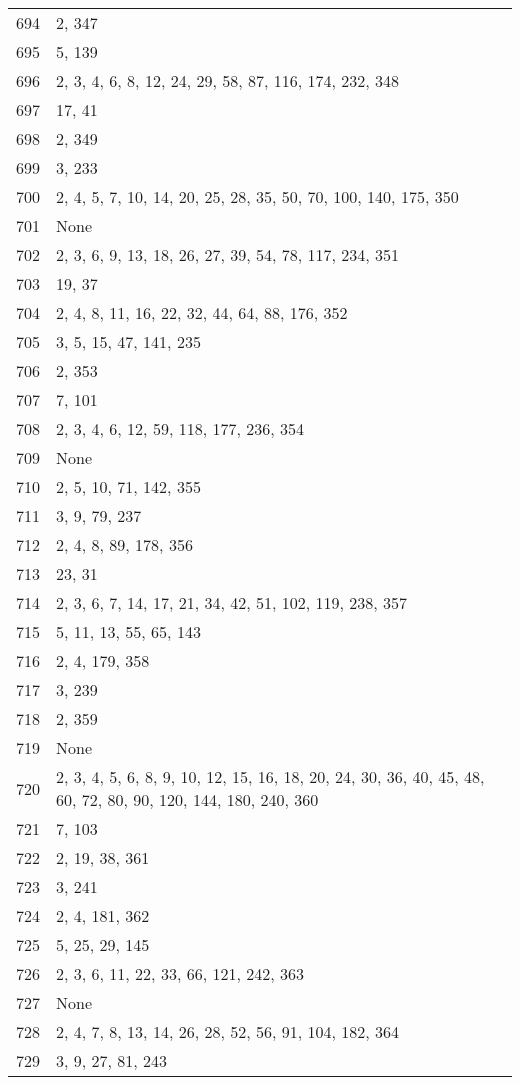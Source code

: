 \documentclass[12pt]{article}
\begin{document}
\begin{tabular}{|r|l|}
694 & 2, 347 \\ 
695 & 5, 139 \\ 
696 & 2, 3, 4, 6, 8, 12, 24, 29, 58, 87, 116, 174, 232, 348 \\ 
697 & 17, 41 \\ 
698 & 2, 349 \\ 
699 & 3, 233 \\ 
700 & 2, 4, 5, 7, 10, 14, 20, 25, 28, 35, 50, 70, 100, 140, 175,  350 \\ 
701 & None \\ 
702 & 2, 3, 6, 9, 13, 18, 26, 27, 39, 54, 78, 117, 234, 351 \\ 
703 & 19, 37 \\ 
704 & 2, 4, 8, 11, 16, 22, 32, 44, 64, 88, 176, 352 \\ 
705 & 3, 5, 15, 47, 141, 235 \\ 
706 & 2, 353 \\ 
707 & 7, 101 \\ 
708 & 2, 3, 4, 6, 12, 59, 118, 177, 236, 354 \\ 
709 & None \\ 
710 & 2, 5, 10, 71, 142, 355 \\ 
711 & 3, 9, 79, 237 \\ 
712 & 2, 4, 8, 89, 178, 356 \\ 
713 & 23, 31 \\ 
714 & 2, 3, 6, 7, 14, 17, 21, 34, 42,  51, 102, 119, 238, 357 \\ 
715 & 5, 11, 13, 55, 65, 143 \\ 
716 & 2,  4, 179, 358 \\ 
717 & 3, 239 \\ 
718 & 2, 359 \\ 
719 & None \\ 
720 & 2, 3, 4, 5, 6, 8, 9, 10, 12, 15, 16, 18,  20, 24, 30, 36, 40, 45, 48, 60, 72, 80, 90, 120, 144, 180, 240,  360 \\ 
721 & 7, 103 \\ 
722 & 2, 19, 38, 361 \\ 
723 & 3, 241 \\ 
724 & 2, 4, 181, 362 \\ 
725 & 5, 25, 29, 145 \\ 
726 & 2, 3, 6, 11, 22, 33,  66, 121, 242, 363 \\ 
727 & None \\ 
728 & 2, 4, 7,  8, 13, 14, 26, 28, 52, 56, 91, 104,  182, 364 \\ 
729 & 3, 9, 27, 81, 243 \\ 

\end{tabular}
\end{document}
